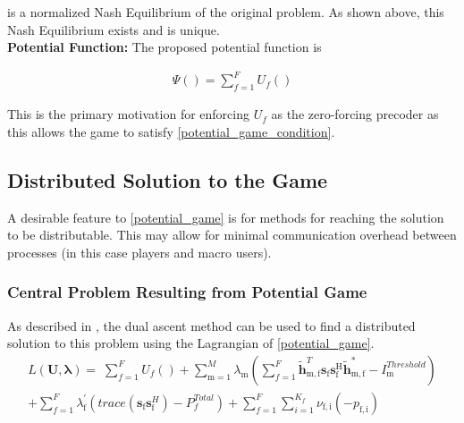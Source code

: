 \documentclass[12pt,a4paper]{report}
\begin{document}
is a normalized Nash Equilibrium of the original problem.
As shown above, this Nash Equilibrium exists and is unique. 
\\
\textbf{Potential Function:} The proposed potential function is 

\begin{gather*} \label{Potential_Function}
\Psi() = \sum_{f = 1}^{F} U_f() 
\end{gather*}

This is the primary motivation for enforcing $U_f$ as the zero-forcing precoder as this allows the game to satisfy \eqref{potential_game_condition}. 


\subsection{Distributed Solution to the Game}
A desirable feature to \eqref{potential_game} is for methods for reaching the solution to be distributable. This may allow for minimal communication overhead between processes (in this case players and macro users).
\subsubsection{Central Problem Resulting from Potential Game}
As described in \cite[p.~8,9]{boyd2011distributed}, the dual ascent method can be used to find a distributed solution to this problem using the Lagrangian of \eqref{potential_game}. 
\\
\begin{multline}
L(\mathbf{U,\lambda}) = 
\;
\sum_{f=1}^F U_f() 
+
\sum_{\mathrm{m=1}}^M \lambda_{\mathrm{m}}
(	  \sum^F_{f=1} \mathbf{\tilde{h}}_{\mathrm{m,f}}^T  \mathbf{s}_{\mathrm{f}} 						
	\mathbf{s_{\mathrm{f}}^{\mathrm{H}}} \mathbf{\tilde{h}_{\mathrm{m,f}}^*} - I^{Threshold}		
	_{\mathrm{m}} )
\\
+ 
\sum_{f=1}^F
\lambda_{\mathrm{f}}^{'}(trace(\mathbf{s}_\mathrm{f}\mathbf{s}_\mathrm{f}^H)-P^{Total}_{f} )
+
\sum_{f=1}^F
\sum_{i=1}^{K_f}
\nu_{\mathrm{f,i}}(-p_{\mathrm{f,i}})
\end{multline}
\end{document}
